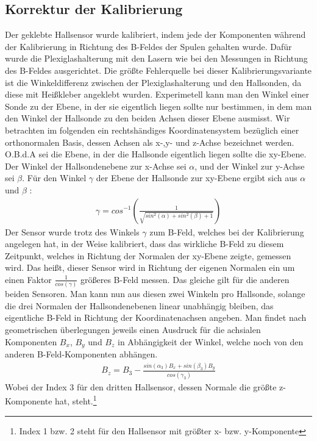 \documentclass[12pt,a4paper]{article}
\begin{document}
\subsection{Korrektur der Kalibrierung}
Der geklebte Hallsensor wurde kalibriert, indem jede der Komponenten während der Kalibrierung in Richtung des B-Feldes der Spulen gehalten wurde.
Dafür wurde die Plexiglashalterung mit den Lasern wie bei den Messungen in Richtung des B-Feldes ausgerichtet. Die größte Fehlerquelle bei dieser Kalibrierungsvariante ist die Winkeldifferenz zwischen der Plexiglashalterung und den Hallsonden, da diese mit Heißkleber angeklebt wurden. Experimetell kann man den Winkel einer Sonde zu der Ebene, in der sie eigentlich liegen sollte nur bestimmen, in dem man den Winkel der Hallsonde zu den beiden Achsen dieser Ebene ausmisst.
Wir betrachten im folgenden ein rechtshändiges Koordinatensystem bezüglich einer orthonormalen Basis, dessen Achsen als x-,y- und z-Achse  bezeichnet werden. O.B.d.A sei die Ebene, in der die Hallsonde eigentlich liegen sollte die xy-Ebene. Der Winkel der Hallsondenebene zur x-Achse sei $\alpha$, und der Winkel zur y-Achse sei $\beta$. Für den Winkel $\gamma$ der Ebene der Hallsonde zur xy-Ebene ergibt sich aus $\alpha$ und $\beta$ :
\begin{align*}
\gamma = cos^{-1}\left(\frac{1}{\sqrt{sin^2(\alpha)+sin^2(\beta)+1}}\right)
\end{align*}
Der Sensor wurde trotz des Winkels $\gamma$ zum B-Feld, welches bei der Kalibrierung angelegen hat, in der Weise kalibriert, dass das wirkliche B-Feld zu diesem Zeitpunkt, welches in Richtung der Normalen der xy-Ebene zeigte, gemessen wird. Das heißt, dieser Sensor wird in Richtung der eigenen Normalen ein um einen Faktor $\frac{1}{cos(\gamma)}$ größeres B-Feld messen. Das gleiche gilt für die anderen beiden Sensoren. Man kann nun aus diesen zwei Winkeln pro Hallsonde, solange die drei Normalen der Hallsondenebenen linear unabhängig bleiben, das eigentliche B-Feld in Richtung der Koordinatenachsen angeben. Man findet nach geometrischen überlegungen jeweils einen Ausdruck für die achsialen Komponenten $B_x$, $B_y$ und $B_z$ in Abhängigkeit der Winkel, welche noch von den anderen B-Feld-Komponenten abhängen.
\begin{align*}
B_z = B_3-\frac{sin(\alpha_3)B_x+sin(\beta_3)B_y}{cos(\gamma_3)}
\end{align*}
Wobei der Index 3 für den dritten Hallsensor, dessen Normale die größte z-Komponente hat, steht.\footnote{Index 1 bzw. 2 steht für den Hallsensor mit größter x- bzw. y-Komponente}
\end{document}
